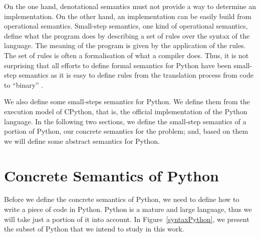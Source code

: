 On the one hand, denotational semantics must not provide a way to determine an implementation.
On the other hand, an implementation can be easily build from operational semantics.
Small-step semantics, one kind of operational semantics, define what the program does by
describing a set of rules over the syntax of the language. The meaning of the program is
given by the application of the rules. The set of rules is often a formalisation of what a
compiler does. Thus, it is not surprising that all efforts to define formal semantics for
Python have been small-step semantics as it is easy to define rules from the translation
process from code to \enquote{binary}
\autocites{ranson_semantics_2008}{guth_formal_2013}{politz_python_2013}{fromherz_static_2018}.

We also define some small-steps semantics for Python. We define them from the execution
model of CPython, that is, the official implementation of the Python language. In the
following two sections, we define the small-step semantics of a portion of Python, our
concrete semantics for the problem; and, based on them we will define some abstract
semantics for Python.

\section{Concrete Semantics of Python}

Before we define the concrete semantics of Python, we need to define how to write a piece
of code in Python. Python is a mature and large language, thus we will take just a portion
of it into account. In Figure~\ref{syntaxPython}, we present the subset of Python that we intend to
study in this work.

